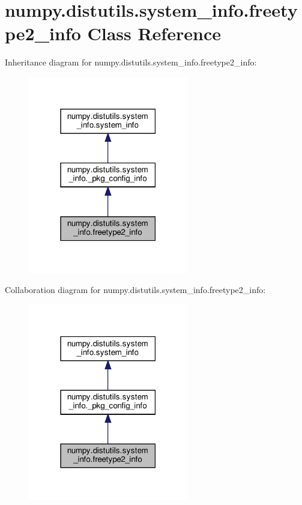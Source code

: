 \hypertarget{classnumpy_1_1distutils_1_1system__info_1_1freetype2__info}{}\section{numpy.\+distutils.\+system\+\_\+info.\+freetype2\+\_\+info Class Reference}
\label{classnumpy_1_1distutils_1_1system__info_1_1freetype2__info}


Inheritance diagram for numpy.\+distutils.\+system\+\_\+info.\+freetype2\+\_\+info\+:
\nopagebreak
\begin{figure}[H]
\begin{center}
\leavevmode
\includegraphics[width=198pt]{classnumpy_1_1distutils_1_1system__info_1_1freetype2__info__inherit__graph}
\end{center}
\end{figure}


Collaboration diagram for numpy.\+distutils.\+system\+\_\+info.\+freetype2\+\_\+info\+:
\nopagebreak
\begin{figure}[H]
\begin{center}
\leavevmode
\includegraphics[width=198pt]{classnumpy_1_1distutils_1_1system__info_1_1freetype2__info__coll__graph}
\end{center}
\end{figure}
